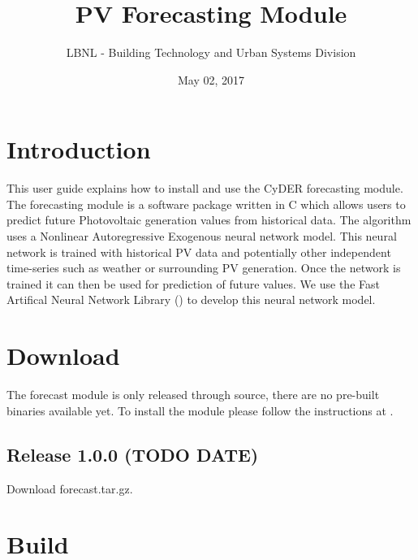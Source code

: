 \documentclass[letterpaper,10pt,english]{sphinxmanual}
\title{PV Forecasting Module}
\date{May 02, 2017}
\author{LBNL - Building Technology and Urban Systems Division}
\begin{document}
\maketitle
\sphinxtableofcontents
{}\label{\detokenize{index::doc}}



\chapter{Introduction}
\label{\detokenize{introduction:introduction}}\label{\detokenize{introduction::doc}}\label{\detokenize{introduction:user-guide}}\label{\detokenize{introduction:id1}}
This user guide explains how to install and use the CyDER forecasting module.
The forecasting module is a software package written in C which allows
users to predict future Photovoltaic generation values from historical data.
The algorithm uses a Nonlinear Autoregressive Exogenous neural network model.
This neural network is trained with historical PV data and potentially other
independent time-series such as weather or surrounding PV generation. Once
the network is trained it can then be used for prediction of future values.
We use the Fast Artifical Neural Network Library ()
to develop this neural network model.


\chapter{Download}
\label{\detokenize{download:download}}\label{\detokenize{download::doc}}\label{\detokenize{download:id1}}
The forecast module is only released through source, there are no pre-built
binaries available yet. To install the module please follow the instructions at {\hyperref[\detokenize{build::doc}]{}}.


\section{Release 1.0.0 (TODO DATE)}
\label{\detokenize{download:release-1-0-0-todo-date}}
Download forecast.tar.gz.
\label{\detokenize{build:build}}

\chapter{Build}
\label{\detokenize{build:id1}}\label{\detokenize{build::doc}}\label{\detokenize{build:check-install}}
\end{document}
